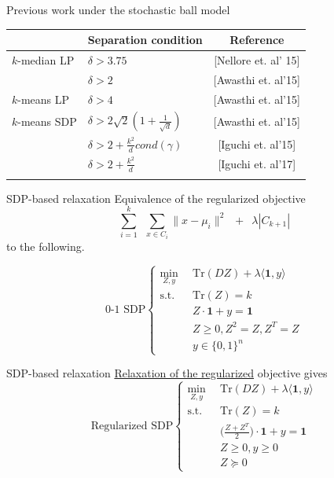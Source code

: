 \documentclass{beamer}
\newcommand{\mb}{\mathbf}
\newcommand{\tr}{\text{Tr}}
\begin{document}
\begin{frame}{Previous work under the stochastic ball model}
	\begin{table}
		\centering
		\label{table:stochasticBall}
		\setlength{\tabcolsep}{0.7em} 
		{\renewcommand{\arraystretch}{1.5}%
		\begin{tabular}{llc}
		\\
		 & Separation condition & Reference\\
		 \hline
		$k$-median LP & $\delta > 3.75$ & \alert{[Nellore et. al' 15]}\\
		 & $\delta > 2$ & \alert{[Awasthi et. al'15]}\\
		\hline
		$k$-means LP & $\delta > 4$ & \alert{[Awasthi et. al'15]}\\
		\hline
		$k$-means SDP & $\delta > 2\sqrt2 (1 + \frac{1}{\sqrt d})$ & \alert{[Awasthi et. al'15]}\\
		 & $\delta > 2 + \frac{k^2}{d}cond(\gamma)$ & \alert{[Iguchi et. al'15]}\\
		 & $\delta > 2 + \frac{k^2}{d}$ & \alert{[Iguchi et. al'17]}\\

		\label{table:alphacenter}
		\end{tabular}
		}
	\end{table}
\end{frame}

\begin{frame}{SDP-based relaxation}
	Equivalence of the regularized objective 
	$$\sum_{i =1}^k\enspace\sum_{x \in C_i} \|x - \mu_i\|^2 \enspace+\enspace \lambda |C_{k+1}|$$ to the following.
	
	$$	
	\text{0-1 SDP}
	\begin{cases}
		\min_{Z, y} \enspace &\tr(DZ) + \lambda \langle \mb 1, y\rangle\\
		\text{s.t. } \enspace &\tr(Z) = k\\
		& Z\cdot \mb 1 + y = \mb 1\\	
		&Z\ge 0, Z^2 = Z, Z^T = Z \\
		& y \in \{0, 1\}^n
	\end{cases}	
	$$
\end{frame}

\begin{frame}{SDP-based relaxation}
	\hyperlink{optimizationNoise}{Relaxation of the regularized} objective gives
	$$	
	\text{Regularized SDP}
	\begin{cases}
		\min_{Z, y} \enspace &\tr(DZ) + \lambda \langle \mb 1, y\rangle\\
        \text{s.t. } \enspace &\tr(Z) = k\\
		& \Big(\frac{Z+Z^T}{2}\Big)\cdot \mb 1 + y = \mb 1\\		
		&Z \ge 0, y \ge 0\\
		& Z \succeq 0
	\end{cases}
	$$
\end{frame}
\end{document}
